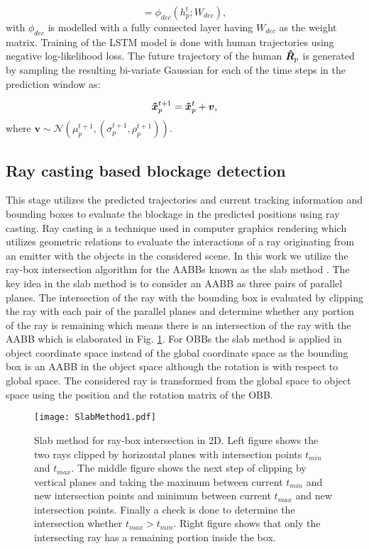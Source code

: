 \documentclass[conference]{IEEEtran}
\begin{document}
\begin{equation}
    [\mu_p^{t+1}, \sigma_p^{t+1}, \rho_p^{t+1}] = \phi_{dec}( h^{t}_p; W_{dec}),
\end{equation}
with $\phi_{dec}$ is modelled with a fully connected layer having $W_{dec}$ as the weight matrix. Training of the LSTM model is done with human trajectories using negative log-likelihood loss. The future trajectory of the human $\bm{\Hat{R}}_p$ is generated by sampling the resulting bi-variate Gaussian for each of the time steps in the prediction window as:

\begin{equation}
    \bm{\Tilde{x}}^{t+1}_p =  \bm{\Tilde{x}}^{t}_p + \bm{v},  
\end{equation}
where $\bm{v} \sim \mathcal{N} ( \mu_p^{t+1} , (\sigma_p^{t+1}, \rho_p^{t+1}))$.

\subsection{Ray casting based blockage detection}

This stage utilizes the predicted trajectories and current tracking information and bounding boxes to evaluate the blockage in the predicted positions using ray casting. Ray casting is a technique used in computer graphics rendering which utilizes geometric relations to evaluate the interactions of a ray originating from an emitter with the objects in the considered scene. In this work we utilize the ray-box intersection algorithm for the AABBs known as the slab method \cite{raybox}. The key idea in the slab method is to consider an AABB as three pairs of parallel planes. The intersection of the ray with the bounding box is evaluated by clipping the ray with each pair of the parallel planes and determine whether any portion of the ray is remaining which means there is an intersection of the ray with the AABB which is elaborated in Fig. \ref{fig:slabmethod}. For OBBs the slab method is applied in object coordinate space instead of the global coordinate space  as the bounding box is an AABB in the object space although the rotation is with respect to global space. The considered ray is transformed from the global space to object space using the position and the rotation matrix of the OBB. 
\begin{figure}[ht]
    \centering
    \texttt{[image: SlabMethod1.pdf]}
    \caption{Slab method for ray-box intersection in 2D. Left figure shows the two rays clipped by horizontal planes with intersection points $t_{min}$ and $t_{max}$. The middle figure shows the next step of clipping by vertical planes and taking the maximum between current $t_{min}$ and new intersection points and minimum between current $t_{max}$ and new intersection points. Finally a check is done to determine the intersection whether $t_{max} > t_{min}$. Right figure shows that only the intersecting ray has a remaining portion inside the box.}
    \label{fig:slabmethod}
\end{figure}
\end{document}
